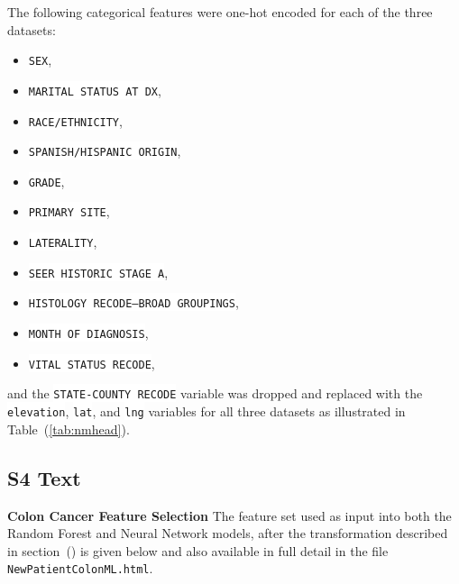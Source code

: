 \documentclass[10pt,letterpaper]{article}
\newcommand{\codewhite}[1]{\colorbox{white}{\texttt{#1}}}
\begin{document}
The following categorical features were one-hot encoded for each of the three datasets:

\begin{itemize}[noitemsep]
\item \codewhite{SEX},
\item  \codewhite{MARITAL STATUS AT DX},
\item \codewhite{RACE/ETHNICITY},
\item \codewhite{SPANISH/HISPANIC ORIGIN},
\item \codewhite{GRADE},
\item \codewhite{PRIMARY SITE},
\item \codewhite{LATERALITY},
\item \codewhite{SEER HISTORIC STAGE A},
\item \codewhite{HISTOLOGY RECODE--BROAD GROUPINGS},
\item \codewhite{MONTH OF DIAGNOSIS},
\item  \codewhite{VITAL STATUS RECODE},
\end{itemize}
and the \codewhite{STATE-COUNTY RECODE} variable was dropped and replaced with the \codewhite{elevation}, \codewhite{lat}, and \codewhite{lng} variables for all three datasets as illustrated in Table~(\ref{tab:nmhead}).


\subsection*{S4 Text}
\label{S4_Text}

{\bf Colon Cancer Feature Selection} The feature set used as input into both the Random Forest and Neural Network models, after the transformation described in section~() is given below and also available in full detail in the file 
\codewhite{NewPatientColonML.html}.
\end{document}

